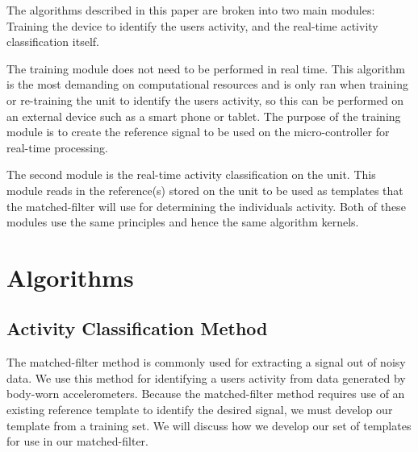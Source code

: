\documentclass[journal]{IEEEtran}
\begin{document}
The algorithms described in this paper are broken into two main modules: Training the device to identify the user\textquotesingle s activity, and the real-time activity classification itself.

The training module does not need to be performed in real time.
This algorithm is the most demanding on computational resources and is only ran when training or re-training the unit to identify the user\textquotesingle s activity, so this can be performed on an external device such as a smart phone or tablet.
The purpose of the training module is to create the reference signal to be used on the micro-controller for real-time processing.

The second module is the real-time activity classification on the unit.
This module reads in the reference(s) stored on the unit to be used as templates that the matched-filter will use for determining the individual\textquotesingle s activity.
Both of these modules use the same principles and hence the same algorithm kernels.
%
\section{Algorithms}
\subsection{Activity Classification Method}
The matched-filter method is commonly used for extracting a signal out of noisy data.
We use this method for identifying a user\textquotesingle s activity from data generated by body-worn accelerometers.
Because the matched-filter method requires use of an existing reference template to identify the desired signal, we must develop our template from a training set.
We will discuss how we develop our set of templates for use in our matched-filter.
\end{document}
